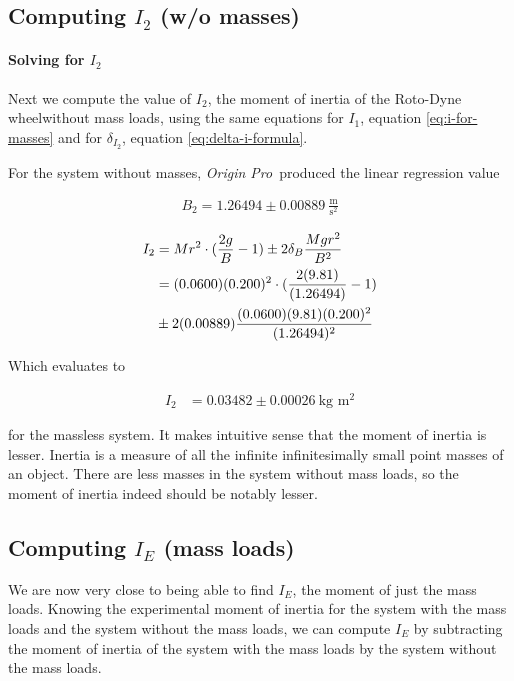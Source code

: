 \documentclass[coverpage]{article}
\newcommand{\softwareText}[1]{\textit{#1}\texttrademark}
\newcommand{\origin}{\softwareText{Origin Pro}}
\newcommand{\iUnit}{\text{kg $\text{m}^2$}}
\newcommand{\rwheel}{Roto-Dyne wheel}
\newcommand{\mpssq}{\frac{\text{m}}{\text{s}^2}}
\begin{document}
	\subsection{Computing $I_2$ (w/o masses)}
	
	\paragraph{Solving for $I_2$}
	
	Next we compute the value of $I_2$, the moment of inertia of the \rwheel without mass loads, using the same equations for $I_1$, equation \ref{eq:i-for-masses} and for $\delta_{I_2}$, equation \ref{eq:delta-i-formula}.
	
	For the system without masses, \origin~produced the linear regression value
	
	\begin{align}
		B_2 = 1.26494 \pm 0.00889\ \mpssq \label{eq:def-b2}
	\end{align}
	
	\begin{align}
		I_2 &= Mr^2 \cdot (\frac{2g}{B} - 1) \pm 2 \delta_B \frac{M g r^2}{B^2} \notag \\
		&= (0.0600)(0.200)^2 \cdot (\frac{2(9.81)}{(1.26494)} - 1) \notag \\
		&\pm 2 (0.00889) \frac{(0.0600) (9.81) (0.200)^2}{(1.26494)^2} \notag
	\end{align}

	Which evaluates to
	
	\begin{align}
		I_2 &= 0.03482 \pm 0.00026\ \iUnit
	\end{align}

	for the massless system. It makes intuitive sense that the moment of inertia is lesser. Inertia is a measure of all the infinite infinitesimally small point masses of an object. There are less masses in the system without mass loads, so the moment of inertia indeed should be notably lesser.
	
	\subsection{Computing $I_E$ (mass loads)}
	
	We are now very close to being able to find $I_E$, the moment of just the mass loads. Knowing the experimental moment of inertia for the system with the mass loads and the system without the mass loads, we can compute $I_E$ by subtracting the moment of inertia of the system with the mass loads by the system without the mass loads.
	
\end{document}
